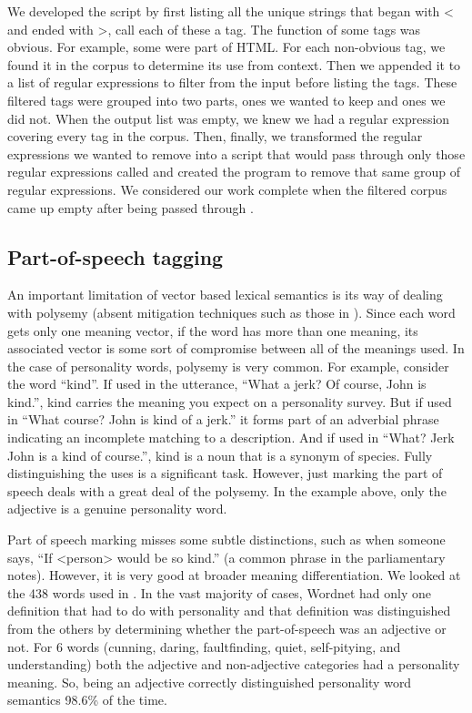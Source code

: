 \documentclass[eric_thesis.tex]{subfiles}
\begin{document}
We developed the script by first listing all the unique strings that began with 
< and ended with >, call each of these a tag. The function of some tags was 
obvious. For example, some were part of HTML. For each non-obvious tag, we found 
it in the corpus to determine its use from context. Then we appended it to a 
list of regular expressions to filter from the input before listing the tags. 
These filtered tags were grouped into two parts, ones we wanted to keep and ones 
we did not. When the output list was empty, we knew we had a regular expression 
covering every tag in the corpus. Then, finally, we transformed the regular 
expressions we wanted to remove into a script that would pass through only those 
regular expressions called  and created the 
 program to remove that same group of regular 
expressions. We considered our work complete when the filtered corpus came up 
empty after being passed through .

\subsection{Part-of-speech tagging}

An important limitation of vector based lexical semantics is its way of dealing 
with polysemy (absent mitigation techniques such as those in ). Since each word gets only one meaning vector, if the 
word has more than one meaning, its associated vector is some sort of compromise 
between all of the meanings used. In the case of personality words, polysemy is 
very common. For example, consider the word ``kind''. If used in the utterance, 
``What a jerk? Of course, John is kind.'', kind carries the meaning you expect 
on a personality survey. But if used in ``What course? John is kind of a jerk.'' 
it forms part of an adverbial phrase indicating an incomplete matching to a 
description. And if used in ``What? Jerk John is a kind of course.'', kind is a 
noun that is a synonym of species. Fully distinguishing the uses is a 
significant task. However, just marking the part of speech deals with a great 
deal of the polysemy. In the example above, only the adjective is a genuine 
personality word. 

Part of speech marking misses some subtle distinctions, such as when someone 
says, ``If <person> would be so kind.'' (a common phrase in the parliamentary 
notes). However, it is very good at broader meaning differentiation. We looked 
at the 438 words used in . In 
the vast majority of cases, Wordnet had only one definition that had to do with 
personality and that definition was distinguished from the others by determining 
whether the part-of-speech was an adjective or not. For 6 words (cunning, 
daring, faultfinding, quiet, self-pitying, and understanding) both the adjective 
and non-adjective categories had a personality meaning. So, being an adjective 
correctly distinguished personality word semantics 98.6\% of the time.
\end{document}
